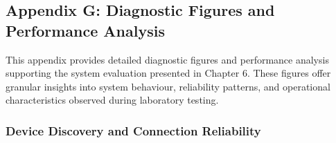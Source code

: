 \documentclass[12pt,a4paper]{article}
\begin{document}
\subsection{Appendix G: Diagnostic Figures and Performance Analysis}\label{appendix-g-diagnostic-figures-and-performance-analysis}

This appendix provides detailed diagnostic figures and performance analysis supporting the system evaluation presented in Chapter 6. These figures offer granular insights into system behaviour, reliability patterns, and operational characteristics observed during laboratory testing.

\subsubsection{Device Discovery and Connection Reliability}\label{device-discovery-and-connection-reliability}
\end{document}
